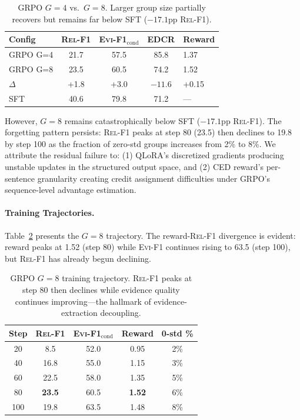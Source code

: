 \documentclass[11pt,a4paper]{article}
\newcommand{\evi}{\textsc{Evi-F1}}
\newcommand{\edcr}{\textsc{EDCR}}
\newcommand{\relf}{\textsc{Rel-F1}}
\begin{document}
\begin{table}[t]
\centering
\small
\begin{tabular}{lcccl}
\toprule
\textbf{Config} & \textbf{\relf{}} & \textbf{\evi{}$_\text{cond}$} & \textbf{\edcr{}} & \textbf{Reward} \\
\midrule
GRPO G=4 & 21.7 & 57.5 & 85.8 & 1.37 \\
GRPO G=8 & 23.5 & 60.5 & 74.2 & 1.52 \\
$\Delta$ & +1.8 & +3.0 & $-11.6$ & +0.15 \\
\midrule
SFT & 40.6 & 79.8 & 71.2 & --- \\
\bottomrule
\end{tabular}
\caption{GRPO $G{=}4$ vs.\ $G{=}8$. Larger group size partially recovers but remains far below SFT ($-17.1$pp \relf{}).}
\label{tab:g4g8}
\end{table}

However, $G{=}8$ remains catastrophically below SFT ($-17.1$pp \relf{}). The forgetting pattern persists: \relf{} peaks at step 80 (23.5) then declines to 19.8 by step 100 as the fraction of zero-std groups increases from 2\% to 8\%. We attribute the residual failure to: (1) QLoRA's discretized gradients producing unstable updates in the structured output space, and (2) CED reward's per-sentence granularity creating credit assignment difficulties under GRPO's sequence-level advantage estimation.

\paragraph{Training Trajectories.}
Table~\ref{tab:grpo_traj} presents the $G{=}8$ trajectory. The reward-\relf{} divergence is evident: reward peaks at 1.52 (step 80) while \evi{} continues rising to 63.5 (step 100), but \relf{} has already begun declining.

\begin{table}[t]
\centering
\small
\begin{tabular}{ccccc}
\toprule
\textbf{Step} & \textbf{\relf{}} & \textbf{\evi{}$_\text{cond}$} & \textbf{Reward} & \textbf{0-std \%} \\
\midrule
20 & 8.5 & 52.0 & 0.95 & 2\% \\
40 & 16.8 & 55.0 & 1.15 & 3\% \\
60 & 22.5 & 58.0 & 1.35 & 5\% \\
80 & \textbf{23.5} & 60.5 & \textbf{1.52} & 6\% \\
100 & 19.8 & 63.5 & 1.48 & 8\% \\
\bottomrule
\end{tabular}
\caption{GRPO $G{=}8$ training trajectory. \relf{} peaks at step 80 then declines while evidence quality continues improving---the hallmark of evidence-extraction decoupling.}
\label{tab:grpo_traj}
\end{table}
\end{document}

